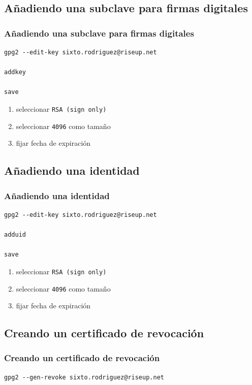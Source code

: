 \documentclass{beamer}
\let\olditem\item
\renewcommand{\item}{%
\olditem\vspace{3pt}}
\begin{document}
\subsection{Añadiendo una subclave para firmas digitales}
\begin{frame}[fragile]
\frametitle{Añadiendo una subclave para firmas digitales}
\begin{lstlisting}
gpg2 --edit-key sixto.rodriguez@riseup.net

addkey

save
\end{lstlisting}
\begin{enumerate}
    \item seleccionar \texttt{RSA (sign only)}
    \item seleccionar \texttt{4096} como tamaño
    \item fijar fecha de expiración
\end{enumerate}
\end{frame}


\subsection{Añadiendo una identidad}
\begin{frame}[fragile]
\frametitle{Añadiendo una identidad}
\begin{lstlisting}
gpg2 --edit-key sixto.rodriguez@riseup.net

adduid

save
\end{lstlisting}
\begin{enumerate}
    \item seleccionar \texttt{RSA (sign only)}
    \item seleccionar \texttt{4096} como tamaño
    \item fijar fecha de expiración
\end{enumerate}
\end{frame}


\subsection{Creando un certificado de revocación}
\begin{frame}[fragile]
\frametitle{Creando un certificado de revocación}
\begin{lstlisting}
gpg2 --gen-revoke sixto.rodriguez@riseup.net
\end{lstlisting}
\end{frame}
\end{document}
